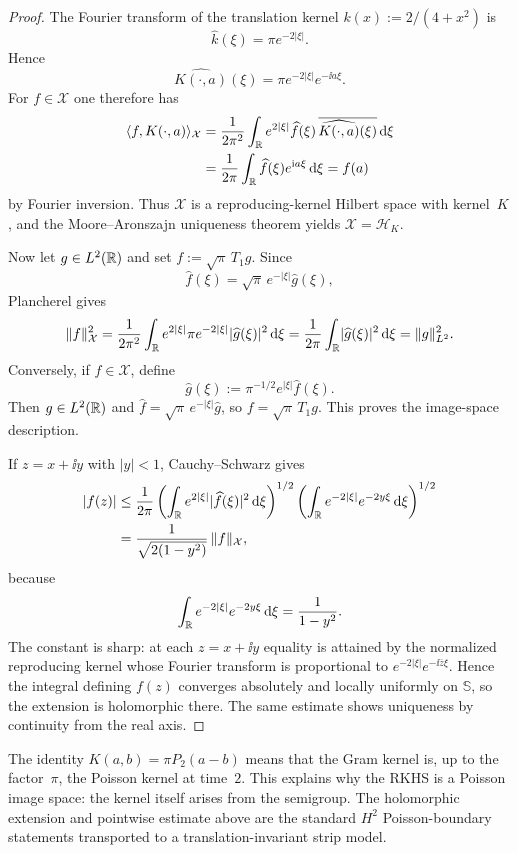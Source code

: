 \begin{proof}
The Fourier transform of the translation kernel $k(x):=2/(4+x^2)$ is
\[
\widehat k(\xi)=\pi e^{-2|\xi|}.
\]
Hence
\[
\widehat{K(\cdot,a)}(\xi)=\pi e^{-2|\xi|}e^{-\ii a\xi}.
\]
For $f\in\mathcal X$ one therefore has
\begin{align*}
\langle f,K(\cdot,a)\rangle_{\mathcal X}
&=
\frac{1}{2\pi^2}\int_{\mathbb{R}}
e^{2|\xi|}\widehat f(\xi)\,
\overline{\widehat{K(\cdot,a)}(\xi)}\,\mathrm{d}\xi \\
&=
\frac{1}{2\pi}\int_{\mathbb{R}}\widehat f(\xi)e^{\mathrm{i} a\xi}\,\mathrm{d}\xi
=f(a)
\end{align*}
by Fourier inversion.  Thus $\mathcal X$ is a reproducing-kernel Hilbert
space with kernel~$K$, and the Moore--Aronszajn uniqueness theorem yields
$\mathcal X=\mathcal H_K$.

Now let $g\in L^2(\mathbb{R})$ and set $f:=\sqrt{\pi}\,T_1 g$.  Since
\[
\widehat f(\xi)=\sqrt{\pi}\,e^{-|\xi|}\widehat g(\xi),
\]
Plancherel gives
\[
\|f\|_{\mathcal X}^2
=\frac{1}{2\pi^2}\int_{\mathbb{R}}e^{2|\xi|}\pi e^{-2|\xi|}
\lvert \widehat g(\xi)\rvert^2\,\mathrm{d}\xi
=\frac{1}{2\pi}\int_{\mathbb{R}}\lvert \widehat g(\xi)\rvert^2\,\mathrm{d}\xi
=\|g\|_{L^2}^2.
\]
Conversely, if $f\in\mathcal X$, define
\[
\widehat g(\xi):=\pi^{-1/2}e^{|\xi|}\widehat f(\xi).
\]
Then $g\in L^2(\mathbb{R})$ and
$\widehat f=\sqrt{\pi}\,e^{-|\xi|}\widehat g$, so
$f=\sqrt{\pi}\,T_1 g$.  This proves the image-space description.

If $z=x+\ii y$ with $|y|<1$, Cauchy--Schwarz gives
\begin{align*}
|f(z)|
&\le \frac{1}{2\pi}
\left(\int_{\mathbb{R}}e^{2|\xi|}\lvert \widehat f(\xi)\rvert^2\,\mathrm{d}\xi\right)^{1/2}
\left(\int_{\mathbb{R}}e^{-2|\xi|}e^{-2y\xi}\,\mathrm{d}\xi\right)^{1/2} \\
&=
\frac{1}{\sqrt{2(1-y^2)}}\,\|f\|_{\mathcal X},
\end{align*}
because
\[
\int_{\mathbb{R}}e^{-2|\xi|}e^{-2y\xi}\,\mathrm{d}\xi=\frac{1}{1-y^2}.
\]
The constant is sharp: at each $z=x+\ii y$ equality is attained by the
normalized reproducing kernel whose Fourier transform is proportional to
$e^{-2|\xi|}e^{-\ii\overline z\xi}$.
Hence the integral defining $f(z)$ converges absolutely and locally
uniformly on $\mathbb S$, so the extension is holomorphic there.  The same
estimate shows uniqueness by continuity from the real axis.
\end{proof}

\begin{remark}\label{rem:poisson-image-framework}
The identity $K(a,b) = \pi P_2(a-b)$ means that the Gram kernel is,
up to the factor~$\pi$, the Poisson kernel at time~$2$.  This explains
why the RKHS is a Poisson image space: the kernel itself arises from the
semigroup.  The holomorphic extension and pointwise estimate above are
the standard $H^2$ Poisson-boundary statements transported to a
translation-invariant strip model.
\end{remark}


